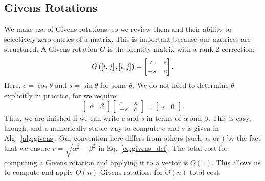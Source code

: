 \subsection{Givens Rotations}
We make use of Givens rotations, so we review them and their
ability to selectively zero entries of a matrix. This is important
because our matrices are structured.
A Givens rotation $G$ is the identity matrix with a rank-2 correction:
%
\begin{equation}
    G\left( \left[ i,j \right],\left[ i,j \right] \right)
        = \begin{bmatrix} c & s \\ -s & c \end{bmatrix}.
\end{equation}
%
Here, $c = \cos\theta$ and $s = \sin\theta$ for some $\theta$.
We do not need to determine $\theta$ explicitly in practice,
for we require
%
\begin{equation}
    \begin{bmatrix}\alpha & \beta \end{bmatrix}
    \begin{bmatrix} c & s \\ -s & c \end{bmatrix}
        = \begin{bmatrix} r & 0 \end{bmatrix}.
    \label{eq:givens_def}
\end{equation}
%
Thus, we are finished if we can write $c$ and $s$ in terms of
$\alpha$ and $\beta$.
This is easy, though, and a numerically stable
way to compute $c$ and $s$ is given in Alg.~\ref{alg:givens}.
Our convention here differs from others
(such as \cite[Alg.~5.1.3]{gvl4} or \cite{bindel2002computing})
by the fact that we ensure $r = \sqrt{\alpha^{2}+\beta^{2}}$
in Eq.~\eqref{eq:givens_def}.
The total cost for computing a Givens rotation and
applying it to a vector is $O(1)$.
This allows us to compute and apply $O(n)$ Givens rotations for $O(n)$
total cost.


